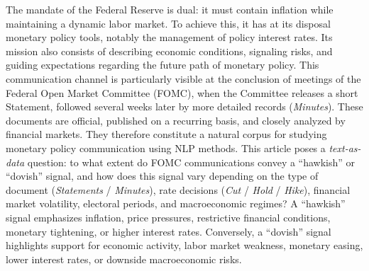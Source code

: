 \documentclass{article}
\begin{document}
The mandate of the Federal Reserve is dual: it must contain inflation while maintaining a dynamic labor market. To achieve this, it has at its disposal monetary policy tools, notably the management of policy interest rates. 
Its mission also consists of describing economic conditions, signaling risks, and guiding expectations regarding the future path of monetary policy. This communication channel is particularly visible at the conclusion of meetings of 
the Federal Open Market Committee (FOMC), when the Committee releases a short Statement, followed several weeks later by more detailed records (\textit{Minutes}). These documents are official, published on a 
recurring basis, and closely analyzed by financial markets. They therefore constitute a natural corpus for studying monetary policy communication using NLP methods.
This article poses a \textit{text-as-data} question: to what extent do FOMC communications convey a ``hawkish'' or ``dovish'' signal, and how does this signal vary depending on the type of 
document (\textit{Statements} / \textit{Minutes}), rate decisions (\textit{Cut} / \textit{Hold} / \textit{Hike}), financial market volatility, electoral periods, and macroeconomic regimes? A ``hawkish'' signal emphasizes inflation, 
price pressures, restrictive financial conditions, monetary tightening, or higher interest rates. Conversely, a ``dovish'' signal highlights support for economic activity, labor market weakness, monetary easing, lower interest rates, 
or downside macroeconomic risks.
\end{document}
